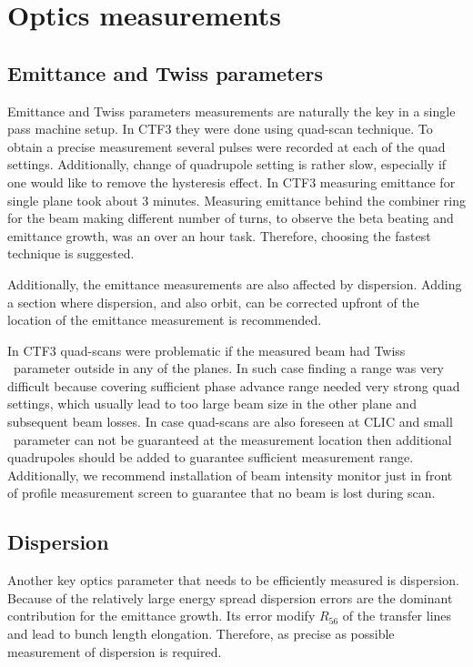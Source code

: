\section{Optics measurements}

\subsection{Emittance and Twiss parameters}

Emittance and Twiss parameters measurements are naturally the key in 
a single pass machine setup. In CTF3 they were done using quad-scan technique. 
To obtain a precise measurement several pulses were recorded at each of the quad settings.
Additionally, change of quadrupole setting is rather slow, especially if one would like to
remove the hysteresis effect. In CTF3 measuring emittance for single plane took about 3 minutes.
Measuring emittance behind the combiner ring for the beam making different number of turns,
to observe the beta beating and emittance growth, was an over an hour task.
Therefore, choosing the fastest technique is suggested.

Additionally, the emittance measurements are also affected by dispersion.
Adding a section where dispersion, and also orbit, can be corrected upfront 
of the location of the emittance measurement is recommended.

In CTF3 quad-scans were problematic if the measured beam had Twiss \textalpha~parameter 
outside  in any of the planes. 
In such case finding a range was very difficult because 
covering sufficient phase advance range needed very strong quad settings, 
which usually lead to too large beam size in the other plane and subsequent beam losses.
In case quad-scans are also foreseen at CLIC and small \textalpha~parameter 
can not be guaranteed at the measurement location then 
additional quadrupoles should be added to guarantee sufficient measurement range.
Additionally, we recommend installation of beam intensity monitor just in front
of profile measurement screen to guarantee that no beam is lost during scan. 

\subsection{Dispersion}

Another key optics parameter that needs to be efficiently measured is dispersion.
Because of the relatively large energy spread dispersion errors are the dominant 
contribution for the emittance growth. Its error  modify $R_{56}$ of the transfer lines and lead to
bunch length elongation. Therefore, as precise as possible measurement of dispersion is required.

